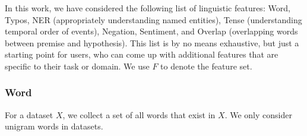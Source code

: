 In this work, we have considered the following list of linguistic features: 
Word, 
Typos, NER (appropriately understanding named entities), 
Tense (understanding temporal order of events), Negation, 
Sentiment, and Overlap (overlapping words between premise and hypothesis). 
This list is by no means exhaustive, but just a starting point for users, 
who can come up with additional features that are specific 
to their task or domain. We use $F$ to denote the feature set.

\subsubsection{Word} For a dataset $X$, 
we collect a set of all words that exist in $X$. We only consider unigram words in datasets.





